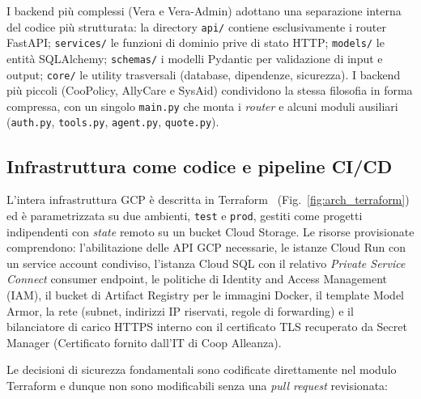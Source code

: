 I backend più complessi (Vera e Vera-Admin) adottano una separazione interna del codice
più strutturata: la directory \texttt{api/} contiene esclusivamente i router
FastAPI; \texttt{services/} le funzioni di dominio prive di stato HTTP;
\texttt{models/} le entit\`a SQLAlchemy; \texttt{schemas/} i modelli Pydantic
per validazione di input e output; \texttt{core/} le utility trasversali
(database, dipendenze, sicurezza). I backend più piccoli (CooPolicy, AllyCare e
SysAid) condividono la stessa filosofia in forma compressa, con
un singolo \texttt{main.py} che monta i \emph{router} e alcuni moduli
ausiliari (\texttt{auth.py}, \texttt{tools.py}, \texttt{agent.py}, \texttt{quote.py}).

\subsection{Infrastruttura come codice e pipeline CI/CD}
\label{subsec:agenti-iac}

L'intera infrastruttura GCP è descritta in Terraform~\cite{terraform_docs} (Fig.~\ref{fig:arch_terraform}) ed è
parametrizzata su due ambienti, \texttt{test} e \texttt{prod}, gestiti come
progetti indipendenti con \emph{state} remoto su un bucket Cloud
Storage. Le risorse provisionate comprendono: l'abilitazione delle API GCP
necessarie, le istanze Cloud Run con un service account condiviso, l'istanza
Cloud SQL con il relativo \emph{Private Service Connect} consumer endpoint, le
politiche di Identity and Access Management (IAM), il bucket di Artifact
Registry per le immagini Docker, il template Model Armor, la rete (subnet,
indirizzi IP riservati, regole di forwarding) e il bilanciatore di carico HTTPS
interno con il certificato TLS recuperato da Secret Manager (Certificato fornito dall'IT di Coop Alleanza).

Le decisioni di sicurezza fondamentali sono codificate direttamente nel
modulo Terraform e dunque non sono modificabili senza una \emph{pull request}
revisionata:

